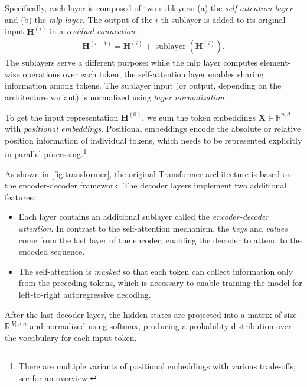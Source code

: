 {Specifically, each layer is composed of two sublayers: (a) the \emph{self-attention layer} and (b) the \emph{\ac{mlp} layer}. The output of the $i$-th sublayer is added to its original input $\mathbf{H}^{(i)}$ in a \emph{residual connection}:
\begin{align}
    \mathbf{H}^{(i+1)} = \mathbf{H}^{(i)} + \operatorname{sublayer}(\mathbf{H}^{(i)}).
\end{align}
The sublayers serve a different purpose: while the \ac{mlp} layer computes element-wise operations over each token, the self-attention layer enables sharing information among tokens. The sublayer input (or output, depending on the architecture variant) is normalized using \emph{layer normalization} \cite{ba2016layer}.

To get the input representation $\mathbf{H}^{(0)}$, we sum the token embeddings $\mathbf{X} \in \mathbb{R}^{n,d}$ with \emph{positional embeddings}. Positional embeddings encode the absolute or relative position information of individual tokens, which needs to be represented explicitly in parallel processing.\footnote{There are multiple variants of positional embeddings with various trade-offs; see \citet{dufter2022position} for an overview.}


As shown in \autoref{fig:transformer}, the original Transformer architecture is based on the encoder-decoder framework. The decoder layers implement two additional features:
\begin{itemize}
    \item Each layer contains an additional sublayer called the \emph{encoder-decoder attention}. In contrast to the self-attention mechanism, the \emph{keys} and \emph{values} come from the last layer of the encoder, enabling the decoder to attend to the encoded sequence.
    \item The self-attention is \emph{masked} so that each token can collect information only from the preceding tokens, which is necessary to enable training the model for left-to-right autoregressive decoding.
\end{itemize}
After the last decoder layer, the hidden states are projected into a matrix of size $\mathbb{R}^{|V|\times n}$ and normalized using softmax, producing a probability distribution over the vocabulary for each input token.

}
